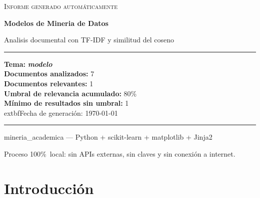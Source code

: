 \documentclass[11pt,a4paper]{article}
\newcommand{\tema}[1]{\textbf{\textit{#1}}}
\newcommand{\pcento}{\%}
\begin{document}
\begin{titlepage}
  \centering
  \vspace*{2.0cm}

  {\Large\textsc{Informe generado automáticamente}\par}
  \vspace{0.7cm}
  {\huge\bfseries Modelos de Mineria de Datos\par}
  \vspace{0.4cm}
  {\large Analisis documental con TF-IDF y similitud del coseno\par}

  \vspace{1.8cm}

  \begin{minipage}{0.92\textwidth}
    \hrule
    \vspace{0.4cm}
    {\small
    \textbf{Tema:} \tema{ modelo }\\[4pt]
    \textbf{Documentos analizados:} 7\\
    \textbf{Documentos relevantes:} 1\\
    \textbf{Umbral de relevancia acumulado:} 80\pcento\\
    \textbf{Mínimo de resultados sin umbral:} 1\\
      	extbf{Fecha de generación:} \today
    \par}
    \vspace{0.4cm}
    \hrule
  \end{minipage}

  \vfill

  {\small mineria\_academica --- Python + scikit-learn + matplotlib + Jinja2\par}
  {\footnotesize
   Proceso 100\pcento\ local: sin APIs externas, sin claves y sin conexión
   a internet.\par}
\end{titlepage}

\tableofcontents
\newpage

\section{Introducción}
\label{sec:introduccion}
\end{document}
